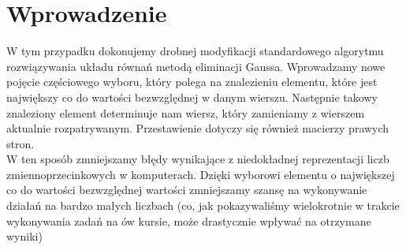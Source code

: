 \documentclass[a4paper,14pt]{report}
\begin{document}
  \section{Wprowadzenie}
  W tym przypadku dokonujemy drobnej modyfikacji standardowego algorytmu rozwiązywania układu równań metodą eliminacji Gaussa. Wprowadzamy nowe pojęcie częściowego wyboru, który polega na znalezieniu elementu, które jest największy co do wartości bezwzględnej w danym wierszu. Następnie takowy znaleziony element determinuje nam wiersz, który zamieniamy z wierszem aktualnie rozpatrywanym. Przestawienie dotyczy się również macierzy prawych stron. \\
  W ten sposób zmniejszamy błędy wynikające z niedokładnej reprezentacji liczb zmiennoprzecinkowych w komputerach. Dzięki wyborowi elementu o największej co do wartości bezwzględnej wartości zmniejszamy szansę na wykonywanie działań na bardzo małych liczbach (co, jak pokazywaliśmy wielokrotnie w trakcie wykonywania zadań na ów kursie, może drastycznie wpływać na otrzymane wyniki)
\end{document}

